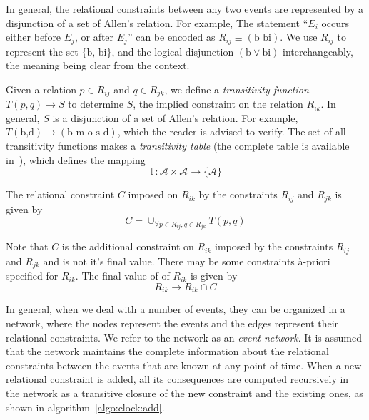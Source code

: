 In general, the relational constraints between any two events are represented by a disjunction of a set of Allen's relation. For 
example, The statement ``$E_i$ occurs either before $E_j$, or after $E_j$'' can be encoded as $R_{ij} \equiv (\text{b bi})$.  
We use $R_{ij}$ to represent the set $\{\text{b, bi}\}$, and the logical disjunction $(\text{b} \vee \text{bi})$ interchangeably,
the meaning being clear from the context. 

\noindent
{}
Given a relation $p \in R_{ij}$ and $q \in R_{jk}$, we define a {\em transitivity function} $T(p,q) \rightarrow S$ to determine
$S$, the implied constraint on the relation $R_{ik}$. In general, $S$ is a disjunction of a set of Allen's relation. For example,
$T(\text{b,d}) \rightarrow (\text{b m o s d})$, which the reader is advised to verify. The set of all transitivity functions makes
a {\em transitivity table} (the complete table is available in~\citep{Allen:1983}), which defines the mapping
\begin{equation}
	\mathbb{T}: \mathcal{A} \times \mathcal{A} \rightarrow \{ \mathcal{A} \}
\end{equation}

\noindent
The relational constraint $C$ imposed on $R_{ik}$ by the constraints $R_{ij}$ and $R_{jk}$ is given by
\begin{equation}
	C = \cup_{\forall p \in R_{ij}, q \in R_{jk}} T(p,q)
\label{eqn:clock:implication}
\end{equation}

\noindent
Note that $C$ is the additional constraint on $R_{ik}$ imposed by the constraints $R_{ij}$ and $R_{jk}$ and is not it's final value. 
There may be some constraints \`{a}-priori specified for $R_{ik}$. The final value of of $R_{ik}$ is given by
\begin{equation}
	R_{ik} \rightarrow R_{ik} \cap C
\end{equation}

In general, when we deal with a number of events, they can be organized in a network, where the nodes represent the events and the 
edges represent their relational constraints. We refer to the network as an {\em event network}. It is assumed that the network maintains 
the complete information about the relational constraints between the events that are known at any point of time. When a new relational 
constraint is added, all its consequences are computed recursively in the network as a transitive closure of the new constraint and the 
existing ones, as shown in algorithm~\ref{algo:clock:add}. 

